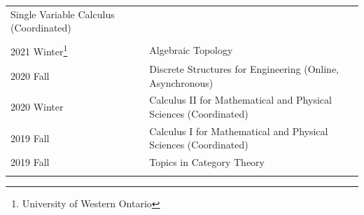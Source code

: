 \documentclass[
]{report}
\begin{document}
\begin{longtable}[]{@{}ll@{}}
\begin{minipage}[t]{0.57\columnwidth}
Single Variable Calculus (Coordinated)\strut
\end{minipage}\tabularnewline
\begin{minipage}[t]{0.37\columnwidth}\raggedright
\strut
\end{minipage} & \begin{minipage}[t]{0.57\columnwidth}\raggedright
\strut
\end{minipage}\tabularnewline
\begin{minipage}[t]{0.37\columnwidth}\raggedright
2021 Winter\footnote{University of Western Ontario}\strut
\end{minipage} & \begin{minipage}[t]{0.57\columnwidth}\raggedright
Algebraic Topology\strut
\end{minipage}\tabularnewline
\begin{minipage}[t]{0.37\columnwidth}\raggedright
2020 Fall\strut
\end{minipage} & \begin{minipage}[t]{0.57\columnwidth}\raggedright
Discrete Structures for Engineering (Online, Asynchronous)\strut
\end{minipage}\tabularnewline
\begin{minipage}[t]{0.37\columnwidth}\raggedright
2020 Winter\strut
\end{minipage} & \begin{minipage}[t]{0.57\columnwidth}\raggedright
Calculus II for Mathematical and Physical Sciences (Coordinated)\strut
\end{minipage}\tabularnewline
\begin{minipage}[t]{0.37\columnwidth}\raggedright
2019 Fall\strut
\end{minipage} & \begin{minipage}[t]{0.57\columnwidth}\raggedright
Calculus I for Mathematical and Physical Sciences (Coordinated)\strut
\end{minipage}\tabularnewline
\begin{minipage}[t]{0.37\columnwidth}\raggedright
2019 Fall\strut
\end{minipage} & \begin{minipage}[t]{0.57\columnwidth}\raggedright
Topics in Category Theory\strut
\end{minipage}\tabularnewline
\begin{minipage}[t]{0.37\columnwidth}\raggedright
\strut
\end{minipage} & \begin{minipage}[t]{0.57\columnwidth}\raggedright

\end{minipage}
\end{longtable}
\end{document}
